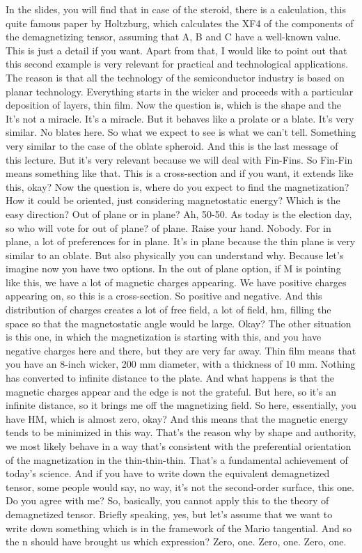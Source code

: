 In the slides, you will find that in case of the steroid, there is a calculation, this quite famous paper by Holtzburg, which calculates the XF4 of the components of the demagnetizing tensor, assuming that A, B and C have a well-known value. This is just a detail if you want. Apart from that, I would like to point out that this second example is very relevant for practical and technological applications. The reason is that all the technology of the semiconductor industry is based on planar technology. Everything starts in the wicker and proceeds with a particular deposition of layers, thin film. Now the question is, which is the shape and the It's not a miracle. It's a miracle. But it behaves like a prolate or a blate. It's very similar. No blates here. So what we expect to see is what we can't tell. Something very similar to the case of the oblate spheroid. And this is the last message of this lecture. But it's very relevant because we will deal with Fin-Fins. So Fin-Fin means something like that. This is a cross-section and if you want, it extends like this, okay? Now the question is, where do you expect to find the magnetization? How it could be oriented, just considering magnetostatic energy? Which is the easy direction? Out of plane or in plane? Ah, 50-50. As today is the election day, so who will vote for out of plane? of plane. Raise your hand. Nobody. For in plane, a lot of preferences for in plane. It's in plane because the thin plane is very similar to an oblate. But also physically you can understand why. Because let's imagine now you have two options. In the out of plane option, if M is pointing like this, we have a lot of magnetic charges appearing. We have positive charges appearing on, so this is a cross-section. So positive and negative. And this distribution of charges creates a lot of free field, a lot of field, hm, filling the space so that the magnetostatic angle would be large. Okay? The other situation is this one, in which the magnetization is starting with this, and you have negative charges here and there, but they are very far away. Thin film means that you have an 8-inch wicker, 200 mm diameter, with a thickness of 10 mm. Nothing has converted to infinite distance to the plate. And what happens is that the magnetic charges appear and the edge is not the grateful. But here, so it's an infinite distance, so it brings me off the magnetizing field. So here, essentially, you have HM, which is almost zero, okay? And this means that the magnetic energy tends to be minimized in this way. That's the reason why by shape and authority, we most likely behave in a way that's consistent with the preferential orientation of the magnetization in the thin-thin-thin. That's a fundamental achievement of today's science. And if you have to write down the equivalent demagnetized tensor, some people would say, no way, it's not the second-order surface, this one. Do you agree with me? So, basically, you cannot apply this to the theory of demagnetized tensor. Briefly speaking, yes, but let's assume that we want to write down something which is in the framework of the Mario tangential. And so the n should have brought us which expression? Zero, one. Zero, one. Zero, one.

